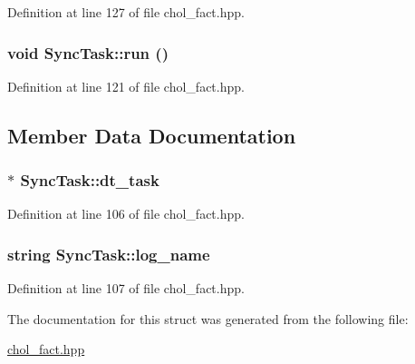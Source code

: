 Definition at line 127 of file chol\_\-fact.hpp.\hypertarget{struct_sync_task_a98f59db0f166b573d7822ca61462cfeb}{
\subsubsection[{run}]{\setlength{\rightskip}{0pt plus 5cm}void SyncTask::run ()}}
\label{struct_sync_task_a98f59db0f166b573d7822ca61462cfeb}


Definition at line 121 of file chol\_\-fact.hpp.

\subsection{Member Data Documentation}
\hypertarget{struct_sync_task_ac74c54d4b27aad281e0334bd9324c6eb}{
\subsubsection[{dt\_\-task}]{$\ast$ {\bf SyncTask::dt\_\-task}}}
\label{struct_sync_task_ac74c54d4b27aad281e0334bd9324c6eb}


Definition at line 106 of file chol\_\-fact.hpp.\hypertarget{struct_sync_task_a188973a0f83d6e5fa9d0d43b1ec4473e}{
\subsubsection[{log\_\-name}]{\setlength{\rightskip}{0pt plus 5cm}string {\bf SyncTask::log\_\-name}}}
\label{struct_sync_task_a188973a0f83d6e5fa9d0d43b1ec4473e}


Definition at line 107 of file chol\_\-fact.hpp.

The documentation for this struct was generated from the following file:\begin{DoxyCompactItemize}
\item 
\hyperlink{chol__fact_8hpp}{chol\_\-fact.hpp}\end{DoxyCompactItemize}
